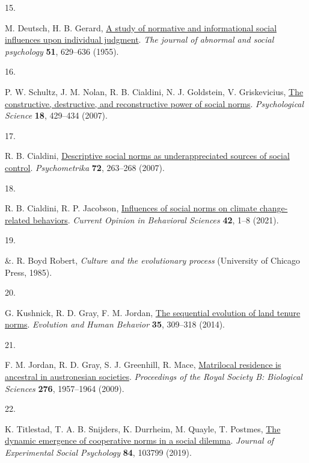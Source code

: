 \documentclass[
  man,floatsintext]{apa6}
\newlength{\cslhangindent}
\newlength{\csllabelwidth}
\newlength{\cslentryspacingunit} %
\newenvironment{CSLReferences}[2] %
 {%
  \setlength{\parindent}{0pt}
  \ifodd #1
  \let\oldpar\par
  \def\par{\hangindent=\cslhangindent\oldpar}
  \fi
  \setlength{\parskip}{#2\cslentryspacingunit}
 }%
 {}
\newcommand{\CSLLeftMargin}[1]{\parbox[t]{\csllabelwidth}{#1}}
\newcommand{\CSLRightInline}[1]{\parbox[t]{\linewidth - \csllabelwidth}{#1}\break}
\begin{document}
\begin{CSLReferences}{0}{0}
\leavevmode{}%
\CSLLeftMargin{15. }%
\CSLRightInline{M. Deutsch, H. B. Gerard, \href{https://doi.org/10.1037/h0046408}{A study of normative and informational social influences upon individual judgment}. \emph{The journal of abnormal and social psychology} \textbf{51}, 629--636 (1955).}

\leavevmode{}%
\CSLLeftMargin{16. }%
\CSLRightInline{P. W. Schultz, J. M. Nolan, R. B. Cialdini, N. J. Goldstein, V. Griskevicius, \href{https://doi.org/10.1111/j.1467-9280.2007.01917.x}{The constructive, destructive, and reconstructive power of social norms}. \emph{Psychological Science} \textbf{18}, 429--434 (2007).}

\leavevmode{}%
\CSLLeftMargin{17. }%
\CSLRightInline{R. B. Cialdini, \href{https://doi.org/10.1007/s11336-006-1560-6}{Descriptive social norms as underappreciated sources of social control}. \emph{Psychometrika} \textbf{72}, 263--268 (2007).}

\leavevmode{}%
\CSLLeftMargin{18. }%
\CSLRightInline{R. B. Cialdini, R. P. Jacobson, \href{https://doi.org/10.1016/j.cobeha.2021.01.005}{Influences of social norms on climate change-related behaviors}. \emph{Current Opinion in Behavioral Sciences} \textbf{42}, 1--8 (2021).}

\leavevmode{}%
\CSLLeftMargin{19. }%
\CSLRightInline{\&. R. Boyd Robert, \emph{Culture and the evolutionary process} (University of Chicago Press, 1985).}

\leavevmode{}%
\CSLLeftMargin{20. }%
\CSLRightInline{G. Kushnick, R. D. Gray, F. M. Jordan, \href{https://doi.org/10.1016/j.evolhumbehav.2014.03.001}{The sequential evolution of land tenure norms}. \emph{Evolution and Human Behavior} \textbf{35}, 309--318 (2014).}

\leavevmode{}%
\CSLLeftMargin{21. }%
\CSLRightInline{F. M. Jordan, R. D. Gray, S. J. Greenhill, R. Mace, \href{https://doi.org/10.1098/rspb.2009.0088}{Matrilocal residence is ancestral in austronesian societies}. \emph{Proceedings of the Royal Society B: Biological Sciences} \textbf{276}, 1957--1964 (2009).}

\leavevmode{}%
\CSLLeftMargin{22. }%
\CSLRightInline{K. Titlestad, T. A. B. Snijders, K. Durrheim, M. Quayle, T. Postmes, \href{https://doi.org/10.1016/j.jesp.2019.03.010}{The dynamic emergence of cooperative norms in a social dilemma}. \emph{Journal of Experimental Social Psychology} \textbf{84}, 103799 (2019).}


\end{CSLReferences}
\end{document}
